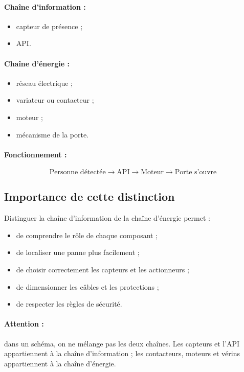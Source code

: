 \paragraph{Chaîne d'information :}
\begin{itemize}
    \item capteur de présence ;
    \item API.
\end{itemize}

\paragraph{Chaîne d'énergie :}
\begin{itemize}
    \item réseau électrique ;
    \item variateur ou contacteur ;
    \item moteur ;
    \item mécanisme de la porte.
\end{itemize}

\paragraph{Fonctionnement :}

\[
\text{Personne détectée} \rightarrow \text{API} \rightarrow \text{Moteur} \rightarrow \text{Porte s'ouvre}
\]

\subsection{Importance de cette distinction}

Distinguer la chaîne d'information de la chaîne d'énergie permet :

\begin{itemize}
    \item de comprendre le rôle de chaque composant ;
    \item de localiser une panne plus facilement ;
    \item de choisir correctement les capteurs et les actionneurs ;
    \item de dimensionner les câbles et les protections ;
    \item de respecter les règles de sécurité.
\end{itemize}

\paragraph{Attention :} dans un schéma, on ne mélange pas les deux chaînes. Les capteurs et l'API appartiennent à la chaîne d'information ; les contacteurs, moteurs et vérins appartiennent à la chaîne d'énergie.

